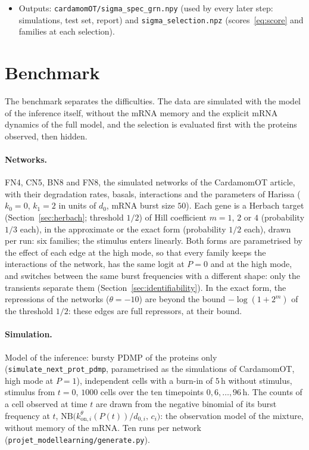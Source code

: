 \documentclass[a4paper, 11pt]{article}
\newcommand{\koni}{k_{\mathrm{on},i}^{\theta}}
\theoremstyle{plain}
\theoremstyle{remark}
\begin{document}
\begin{itemize}[nosep]
\item Outputs: \texttt{cardamomOT/sigma\_spec\_grn.npy} (used by every later step: simulations, test set, report) and \texttt{sigma\_selection.npz} (scores~\eqref{eq:score} and families at each selection).
\end{itemize}

\section{Benchmark}\label{sec:benchmark}

The benchmark separates the difficulties. The data are simulated with the model of the inference itself, without the mRNA memory and the explicit mRNA dynamics of the full model, and the selection is evaluated first with the proteins observed, then hidden.

\paragraph{Networks.} FN4, CN5, BN8 and FN8, the simulated networks of the CardamomOT article, with their degradation rates, basals, interactions and the parameters of Harissa ($k_0 = 0$, $k_1 = 2$ in units of $d_0$, mRNA burst size $50$). Each gene is a Herbach target (Section~\ref{sec:herbach}; threshold $1/2$) of Hill coefficient $m = 1$, $2$ or $4$ (probability $1/3$ each), in the approximate or the exact form (probability $1/2$ each), drawn per run: six families; the stimulus enters linearly. Both forms are parametrised by the effect of each edge at the high mode, so that every family keeps the interactions of the network, has the same logit at $P = 0$ and at the high mode, and switches between the same burst frequencies with a different shape: only the transients separate them (Section~\ref{sec:identifiability}). In the exact form, the repressions of the networks ($\theta = -10$) are beyond the bound $-\log(1 + 2^m)$ of the threshold $1/2$: these edges are full repressors, at their bound.

\paragraph{Simulation.} Model of the inference: bursty PDMP of the proteins only (\texttt{simulate\_next\_prot\_pdmp}, parametrised as the simulations of CardamomOT, high mode at $P = 1$), independent cells with a burn-in of $5$\,h without stimulus, stimulus from $t = 0$, $1000$ cells over the ten timepoints $0, 6, \dots, 96$\,h. The counts of a cell observed at time $t$ are drawn from the negative binomial of its burst frequency at $t$, $\mathrm{NB}\bigl(\koni(P(t))/d_{0,i},\, c_i\bigr)$: the observation model of the mixture, without memory of the mRNA. Ten runs per network (\texttt{projet\_modellearning/generate.py}).
\end{document}
